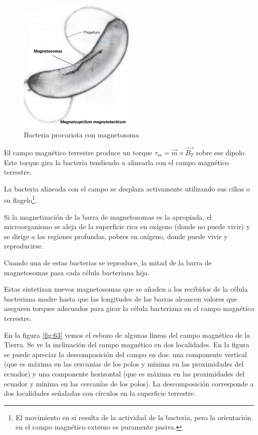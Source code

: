 \begin{figure}[H]
    \centering
    \includegraphics[width=0.5\textwidth]{./Figures/magnetosoma01}
	\caption{Bacteria procariota con magnetosoma}
	\label{fig:magnetosoma01}
\end{figure}

El campo magnético terrestre produce un torque $\tau_{m}=\overrightarrow{m} \times \overrightarrow{B_{T}}$ sobre ese dipolo. 
Este torque gira la bacteria tendiendo a alinearla con el campo magnético terrestre.

La bacteria alineada con el campo se desplaza activamente utilizando sus cilias o su flagelo\footnote{El movimiento en sí resulta de la actividad de la bacteria, pero la orientación en el campo magnético externo es puramente pasiva.}. 

Si la magnetización de la barra de magnetosomas es la apropiada, el microorganismo se aleja de la superficie rica en oxígeno (donde no puede vivir) y se dirige a las regiones profundas, pobres en oxígeno, donde puede vivir y reproducirse.

Cuando una de estas bacterias se reproduce, la mitad de la barra de magnetosomas pasa cada célula bacteriana hija.

Estas sintetizan nuevos magnetosomas que se añaden a los recibidos de la célula bacteriana madre hasta que las longitudes de las barras alcancen valores que aseguren torques adecuados para girar la célula bacteriana en el campo magnético terrestre.


En la figura \ref{fig:63} vemos el esbozo de algunas líneas del campo magnético de la Tierra. Se ve la inclinación del campo magnético en dos localidades. En la figura se puede apreciar la descomposición del campo en dos: una componente vertical (que es máxima en las cercanías de los polos y mínima en las proximidades del ecuador) y una componente horizontal (que es máxima en las proximidades del ecuador y mínima en las cercanías de los polos). La descomposición corresponde a dos localidades señaladas con círculos en la superficie terrestre.

